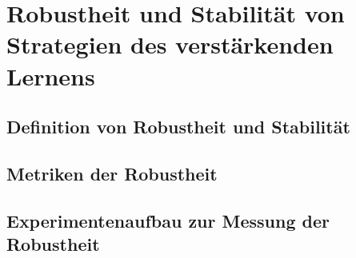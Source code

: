 \section{Robustheit und Stabilität von Strategien des verstärkenden Lernens}

\subsection{Definition von Robustheit und Stabilität}

\subsection{Metriken der Robustheit}

\subsection{Experimentenaufbau zur Messung der Robustheit}

